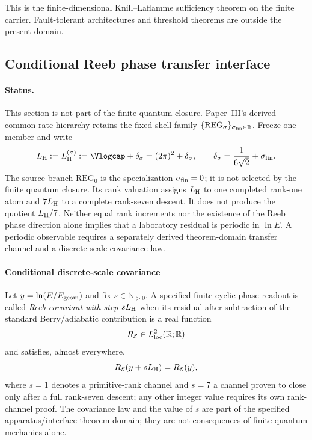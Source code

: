 \documentclass[12pt,a4paper]{article}
\begin{document}
This is the finite-dimensional Knill--Laflamme sufficiency theorem on the finite carrier.  Fault-tolerant architectures and threshold theorems are outside the present domain.




\subsection[Conditional Reeb phase transfer interface]
{Conditional Reeb phase transfer interface}
\label{p4:sec:part3-signature}

\paragraph{Status.}
This section is not part of the finite quantum closure.  Paper~III's derived
common-rate hierarchy retains the fixed-shell family
\(\{\mathrm{REG}_\sigma\}_{\sigma_{\rm fin}\in\mathbb R}\).  Freeze one
member and write
\begin{equation}
\label{p4:eq:reeb-completed-step-import}
L_{\rm H}:=L_{\rm H}^{(\sigma)}
:=\Vlogcap+\delta_\sigma
=(2\pi)^2+\delta_\sigma,
\qquad
\delta_\sigma=\frac1{6\sqrt2}+\sigma_{\rm fin}.
\end{equation}
The source branch \(\mathrm{REG}_0\) is the specialization
\(\sigma_{\rm fin}=0\); it is not selected by the finite quantum closure.
Its rank valuation assigns \(L_{\rm H}\) to one completed rank-one atom and
\(7L_{\rm H}\) to a complete rank-seven descent.  It does not produce the quotient
\(L_{\rm H}/7\).  Neither equal rank increments nor the existence of the Reeb phase
direction alone implies that a laboratory residual is periodic in \(\ln E\).  A
periodic observable requires a separately derived theorem-domain transfer channel and
a discrete-scale covariance law.



\paragraph{Conditional discrete-scale covariance}
\label{p4:sec:part3-reeb-phase}

\begin{definition}
\label{p4:def:reeb-sensitive-readout}
Let \(y=\ln(E/E_{\rm geom})\) and fix \(s\in\mathbb N_{>0}\).  A specified
finite cyclic phase readout is called
\emph{Reeb-covariant with step \(sL_{\rm H}\)} when its residual after subtraction of
the standard Berry/adiabatic contribution is a real function
\[
R_{\mathcal E}\in L^2_{\rm loc}(\mathbb R;\mathbb R)
\]
and satisfies, almost everywhere,
\[
R_{\mathcal E}(y+sL_{\rm H})=R_{\mathcal E}(y),
\]
where \(s=1\) denotes a primitive-rank channel and \(s=7\) a channel proven to close
only after a full rank-seven descent; any other integer value requires its own rank-channel proof.  The covariance law and the value of \(s\) are
part of the specified apparatus/interface theorem domain; they are not consequences
of finite quantum mechanics alone.
\end{definition}
\end{document}

